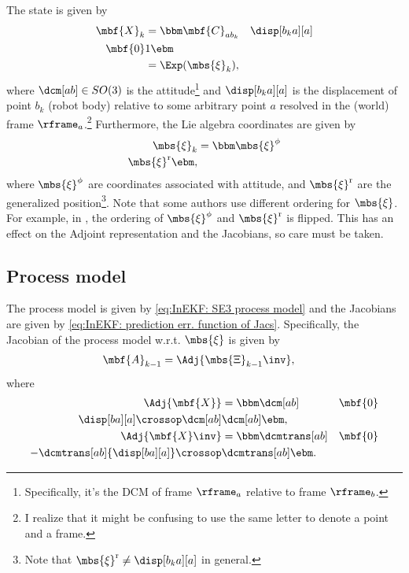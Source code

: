 \documentclass[nobib]{tufte-handout}
\begin{document}
    The state is given by
    \begin{align}
        \mbf{X}_{k} &= 
        \bbm \mbf{C}_{ab_{k}} &\disp[b_{k}a][a] \\ \mbf{0} & 1 \ebm\\
        &= \Exp(\mbs{\xi}_{k}),
    \end{align}
    where $\dcm[ab]\in SO(3)$ is the attitude\footnote{Specifically, it's the DCM of frame $\rframe_{a}$ relative to frame $\rframe_{b}$.} and $\disp[b_{k}a][a]$ is the displacement of point $b_{k}$ (robot body) relative to some arbitrary point $a$ resolved in the (world) frame $\rframe_{a}$.\footnote{I realize that it might be confusing to use the same letter to denote a point and a frame.} 
    Furthermore, the Lie algebra coordinates are given by
    \begin{align}
        \label{eq:SE2 xi = [xiphi; xir]}
        \mbs{\xi}_{k} &=
        \bbm 
            \mbs{\xi}^{\phi}\\
            \mbs{\xi}^{\mathrm{r}}
        \ebm,
    \end{align}
    where $\mbs{\xi}^{\phi}$ are coordinates associated with attitude, and $\mbs{\xi}^{\mathrm{r}}$ are the generalized position\footnote{Note that $\mbs{\xi}^{\mathrm{r}}\neq\disp[b_{k}a][a]$ in general.}. Note that some authors use different ordering for $\mbs{\xi}$. For example, in \cite{Barfoot_State_2017a}, the ordering of $\mbs{\xi}^{\phi}$ and $\mbs{\xi}^{\mathrm{r}}$ is flipped. This has an effect on the Adjoint representation and the Jacobians, so care must be taken.

    \subsection{Process model}
    The process model is given by \eqref{eq:InEKF: SE3 process model} and the Jacobians are given by \eqref{eq:InEKF: prediction err. function of Jacs}.
    Specifically, the Jacobian of the process model w.r.t. $\mbs{\xi}$ is given by
    \begin{align}
        \mbf{A}_{k-1} &= \Adj{\mbs{\Xi}_{k-1}\inv},
    \end{align}
    where
    \begin{align}
        \Adj{\mbf{X}} &= 
        \bbm
            \dcm[ab] & \mbf{0} \\ 
            {\disp[ba][a]}\crossop\dcm[ab] & \dcm[ab]
        \ebm,\\
        \Adj{\mbf{X}\inv} &=
        \bbm
        \dcmtrans[ab] & \mbf{0} \\ 
        -\dcmtrans[ab]{\disp[ba][a]}\crossop & \dcmtrans[ab]
        \ebm.
    \end{align}
    
\end{document}
